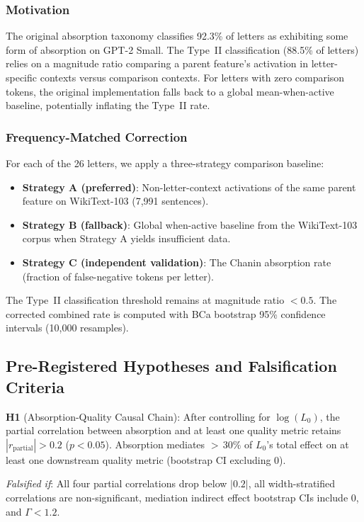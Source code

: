 \documentclass{article}
\begin{document}
\subsubsection{Motivation}

The original \citet{chanin2024absorption} absorption taxonomy classifies 92.3\% of letters as exhibiting some form of absorption on GPT-2 Small.
The Type~II classification (88.5\% of letters) relies on a magnitude ratio comparing a parent feature's activation in letter-specific contexts versus comparison contexts.
For letters with zero comparison tokens, the original implementation falls back to a global mean-when-active baseline, potentially inflating the Type~II rate.

\subsubsection{Frequency-Matched Correction}

For each of the 26 letters, we apply a three-strategy comparison baseline:
\begin{itemize}
\item \textbf{Strategy A (preferred)}: Non-letter-context activations of the same parent feature on WikiText-103 (7,991 sentences).
\item \textbf{Strategy B (fallback)}: Global when-active baseline from the WikiText-103 corpus when Strategy A yields insufficient data.
\item \textbf{Strategy C (independent validation)}: The Chanin absorption rate (fraction of false-negative tokens per letter).
\end{itemize}

The Type~II classification threshold remains at magnitude ratio $< 0.5$.
The corrected combined rate is computed with BCa bootstrap 95\% confidence intervals (10,000 resamples).

\subsection{Pre-Registered Hypotheses and Falsification Criteria}

\textbf{H1} (Absorption-Quality Causal Chain): After controlling for $\log(L_0)$, the partial correlation between absorption and at least one quality metric retains $|r_{\text{partial}}| > 0.2$ ($p < 0.05$).
Absorption mediates ${>}\,30\%$ of $L_0$'s total effect on at least one downstream quality metric (bootstrap CI excluding 0).

\emph{Falsified if}: All four partial correlations drop below $|0.2|$, all width-stratified correlations are non-significant, mediation indirect effect bootstrap CIs include 0, and $\Gamma < 1.2$.
\end{document}
